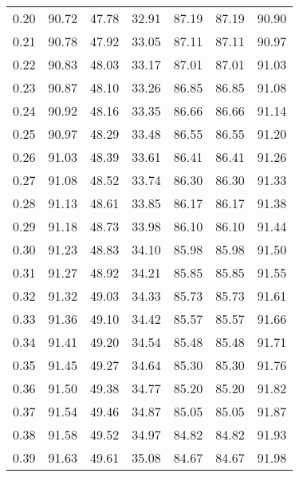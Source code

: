 \begin{tabular}{|c|c|c|c|c|c|c|}
      0.20 &     90.72 &     47.78 &      32.91 &   87.19 &      87.19 &         90.90 \\
      0.21 &     90.78 &     47.92 &      33.05 &   87.11 &      87.11 &         90.97 \\
      0.22 &     90.83 &     48.03 &      33.17 &   87.01 &      87.01 &         91.03 \\
      0.23 &     90.87 &     48.10 &      33.26 &   86.85 &      86.85 &         91.08 \\
      0.24 &     90.92 &     48.16 &      33.35 &   86.66 &      86.66 &         91.14 \\
      0.25 &     90.97 &     48.29 &      33.48 &   86.55 &      86.55 &         91.20 \\
      0.26 &     91.03 &     48.39 &      33.61 &   86.41 &      86.41 &         91.26 \\
      0.27 &     91.08 &     48.52 &      33.74 &   86.30 &      86.30 &         91.33 \\
      0.28 &     91.13 &     48.61 &      33.85 &   86.17 &      86.17 &         91.38 \\
      0.29 &     91.18 &     48.73 &      33.98 &   86.10 &      86.10 &         91.44 \\
      0.30 &     91.23 &     48.83 &      34.10 &   85.98 &      85.98 &         91.50 \\
      0.31 &     91.27 &     48.92 &      34.21 &   85.85 &      85.85 &         91.55 \\
      0.32 &     91.32 &     49.03 &      34.33 &   85.73 &      85.73 &         91.61 \\
      0.33 &     91.36 &     49.10 &      34.42 &   85.57 &      85.57 &         91.66 \\
      0.34 &     91.41 &     49.20 &      34.54 &   85.48 &      85.48 &         91.71 \\
      0.35 &     91.45 &     49.27 &      34.64 &   85.30 &      85.30 &         91.76 \\
      0.36 &     91.50 &     49.38 &      34.77 &   85.20 &      85.20 &         91.82 \\
      0.37 &     91.54 &     49.46 &      34.87 &   85.05 &      85.05 &         91.87 \\
      0.38 &     91.58 &     49.52 &      34.97 &   84.82 &      84.82 &         91.93 \\
      0.39 &     91.63 &     49.61 &      35.08 &   84.67 &      84.67 &         91.98 \\

\end{tabular}
